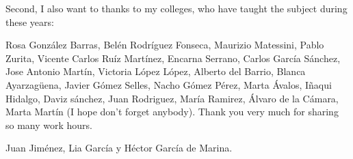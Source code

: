 \begin{paracol}{2}
\switchcolumn
Second, I also want to thanks to my colleges, who have taught the subject during these years: 

Rosa González Barras, Belén Rodríguez Fonseca, Maurizio Matessini, Pablo Zurita, Vicente Carlos Ruíz Martínez, Encarna Serrano, Carlos García Sánchez, Jose Antonio Martín, Victoria López López,  Alberto del Barrio, Blanca Ayarzagüena, Javier Gómez Selles, Nacho Gómez Pérez, Marta Ávalos, Iñaqui Hidalgo, Daviz sánchez,  Juan Rodriguez, María Ramirez, Álvaro de la Cámara, Marta Martín (I hope don't forget anybody). Thank you very much for sharing so many work hours.

\end{paracol}
\begin{flushright}
Juan Jiménez, Lia García y Héctor García de Marina.
\end{flushright}

